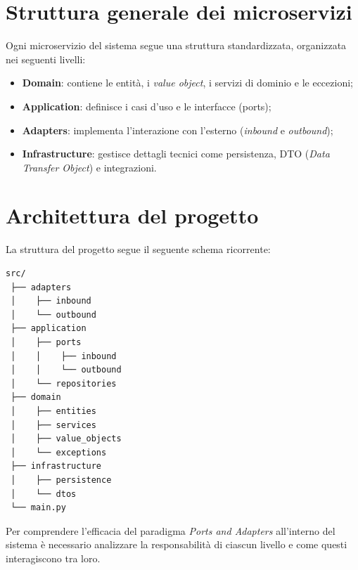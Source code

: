 \section{Struttura generale dei microservizi}
Ogni microservizio del sistema segue una struttura standardizzata, 
organizzata nei seguenti livelli:
\begin{itemize}
    \item \textbf{Domain}: contiene le entità, i \textit{value object}, i servizi di dominio e le eccezioni;
    \item \textbf{Application}: definisce i casi d’uso e le interfacce (ports);
    \item \textbf{Adapters}: implementa l’interazione con l’esterno (\textit{inbound} e \textit{outbound});
    \item \textbf{Infrastructure}: gestisce dettagli tecnici come persistenza, DTO (\textit{Data Transfer Object}) e integrazioni.
\end{itemize}


\section{Architettura del progetto}
La struttura del progetto segue il seguente schema ricorrente:
\begin{verbatim}
src/
 ├── adapters
 │    ├── inbound
 │    └── outbound
 ├── application
 │    ├── ports
 │    │    ├── inbound
 │    │    └── outbound
 │    └── repositories
 ├── domain
 │    ├── entities
 │    ├── services
 │    ├── value_objects
 │    └── exceptions
 ├── infrastructure
 │    ├── persistence
 │    └── dtos
 └── main.py
\end{verbatim}
Per comprendere l'efficacia del paradigma \textit{Ports and Adapters} 
all'interno del sistema è necessario analizzare la responsabilità di ciascun livello 
e come questi interagiscono tra loro.


